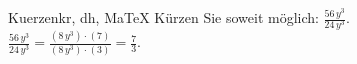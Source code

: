 \begin{MAufgabe}{Kuerzen}{kr, dh, MaTeX}
K\"urzen Sie soweit m\"oglich: $\frac{56\, y^3}{24\, y^3}$.\\ 
\ifLsg\MLoesung
\quad $\frac{56\, y^3}{24\, y^3}=\frac{(8\, y^3)\cdot(7)}{(8\, y^3)\cdot(3)}=\frac{7}{3}$.\else\relax\fi
 \end{MAufgabe}